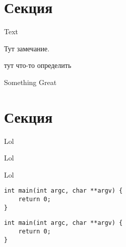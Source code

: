 \documentclass{mai_book}
\begin{document}
\section{Секция}

\begin{namedlisting}
Text
\end{namedlisting}
 
\begin{mynotice}
Тут замечание.
\end{mynotice}
 
 
\begin{determ}[Lol]
тут что-то определить
\end{determ}

\begin{thm}
Something Great
\end{thm}
\section{Секция}

\begin{sled}
Lol
\end{sled}

\begin{bezpodpisi}
Lol
\end{bezpodpisi}

\begin{thm}
Lol
\end{thm}


\begin{lstlisting}
int main(int argc, char **argv) {
    return 0;
}
\end{lstlisting}

\begin{lstlisting}[frame=none]
int main(int argc, char **argv) {
    return 0;
}
\end{lstlisting}
\end{document}
